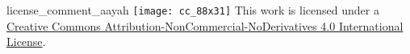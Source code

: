 \begin{taggedblock}{license_comment_aayah}
\texttt{[image: cc\_88x31]}
This work is licensed under a 
\href{http://creativecommons.org/licenses/by-nc-nd/4.0/}{Creative Commons Attribution-NonCommercial-NoDerivatives 4.0 International License}.
\end{taggedblock}
\begin{comment}
Please use the following for footnotes:- Sample\footnoteQ{Text of Qur'an footnote goes here.}.
Sample\footnoteT{Text of Tafseer footnote goes here.}.
\end{comment}